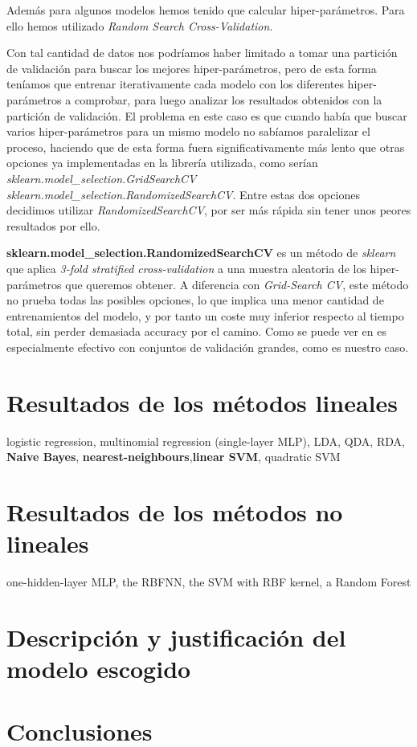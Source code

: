 \documentclass[a4paper]{article}
\begin{document}
Además para algunos modelos hemos tenido que calcular hiper-parámetros. Para ello hemos utilizado \textit{Random Search Cross-Validation}.

Con tal cantidad de datos nos podríamos haber limitado a tomar una partición de validación para buscar los mejores hiper-parámetros, pero de 
esta forma teníamos que entrenar iterativamente cada modelo con los diferentes hiper-parámetros a comprobar, para luego analizar los resultados obtenidos con la partición de validación. El problema en este caso es que cuando había que buscar varios hiper-parámetros para un mismo modelo no sabíamos paralelizar el proceso, haciendo que de esta forma fuera significativamente más lento que otras opciones ya implementadas en la librería utilizada, como serían \textit{sklearn.model\_selection.GridSearchCV} \textit{sklearn.model\_selection.RandomizedSearchCV}. Entre estas dos opciones decidimos utilizar \textit{RandomizedSearchCV}, por ser más rápida sin tener unos peores resultados por ello. 

\textbf{sklearn.model\_selection.RandomizedSearchCV} es un método de \textit{sklearn} que aplica \textit{3-fold stratified cross-validation} a una muestra aleatoria de los hiper-parámetros que queremos obtener. A diferencia con \textit{Grid-Search CV}, este método no prueba todas las posibles opciones, lo que implica una menor cantidad de entrenamientos del modelo, y por tanto un coste muy inferior respecto al tiempo  total, sin perder demasiada accuracy por el camino. Como se puede ver en \cite{randomSearch} es especialmente efectivo con conjuntos de validación grandes, como es nuestro caso. 

\section{Resultados de los métodos lineales}
logistic regression, multinomial regression
(single-layer MLP), LDA, QDA, RDA, \textbf{Naive Bayes}, \textbf{nearest-neighbours},\textbf{linear SVM}, quadratic SVM
\section{Resultados de los métodos no lineales}
one-hidden-layer MLP, the RBFNN, the SVM with RBF kernel, a
Random Forest
\section{Descripción y justificación del modelo escogido}

\section{Conclusiones}



\end{document}
